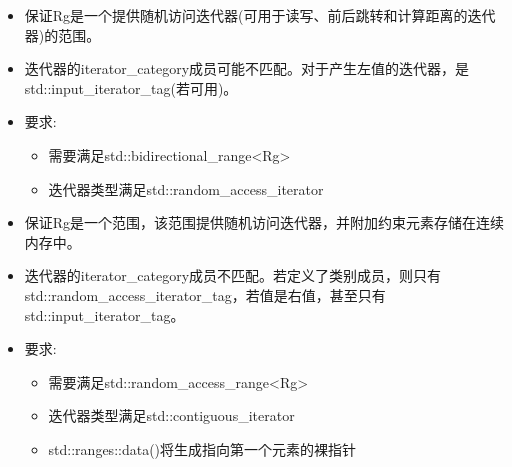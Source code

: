 
\begin{itemize}
\item
保证Rg是一个提供随机访问迭代器(可用于读写、前后跳转和计算距离的迭代器)的范围。

\item
迭代器的iterator\_category成员可能不匹配。对于产生左值的迭代器，是std::input\_iterator\_tag(若可用)。

\item
要求:

\begin{itemize}
\item
需要满足std::bidirectional\_range<Rg>

\item
迭代器类型满足std::random\_access\_iterator
\end{itemize}
\end{itemize}


\begin{itemize}
\item
保证Rg是一个范围，该范围提供随机访问迭代器，并附加约束元素存储在连续内存中。

\item
迭代器的iterator\_category成员不匹配。若定义了类别成员，则只有std::random\_access\_iterator\_tag，若值是右值，甚至只有std::input\_iterator\_tag。

\item
要求:

\begin{itemize}
\item
需要满足std::random\_access\_range<Rg>

\item
迭代器类型满足std::contiguous\_iterator

\item
std::ranges::data()将生成指向第一个元素的裸指针
\end{itemize}
\end{itemize}


